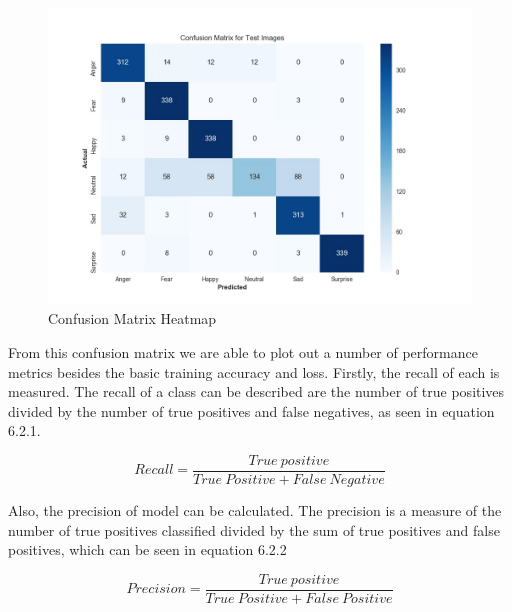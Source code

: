 \begin{figure}[ht]
	\begin{center}
		\advance\leftskip-3cm
		\advance\rightskip-3cm
		\includegraphics[keepaspectratio=true,scale=0.5]{__resources/Results/confusion.jpg}
		\caption{Confusion Matrix Heatmap}
		\label{conf}
	\end{center}
\end{figure}
\newpage

From this confusion matrix we are able to plot out a number of performance metrics besides the basic training accuracy and loss. Firstly, the recall of each is measured. The recall of a class can be described are the number of true positives divided by the number of true positives and false negatives, as seen in equation 6.2.1. 

\begin{equation}\label{eq:recall}
Recall = 
\frac{
True\ positive
}{
True\ Positive + False\ Negative
}
\end{equation}

Also, the precision of model can be calculated. The precision is a measure of the number of true positives classified divided by the sum of true positives and false positives, which can be seen in equation 6.2.2

\begin{equation}\label{eq:precision}
Precision = 
\frac{
	True\ positive
}{
	True\ Positive + False\ Positive
}
\end{equation}

